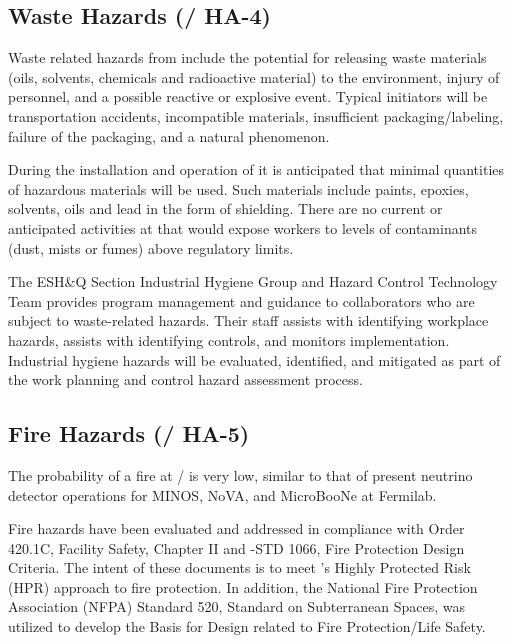 \subsection{Waste Hazards (/ HA-4)}

Waste related hazards from  include the potential for releasing
waste materials (oils, solvents, chemicals and radioactive material)
to the environment, injury of personnel, and a possible reactive or
explosive event. Typical initiators will be transportation accidents,
incompatible materials, insufficient packaging/labeling, failure of
the packaging, and a natural phenomenon.

During the installation and operation of  it is anticipated that
minimal quantities of hazardous materials will be used. Such materials
include paints, epoxies, solvents, oils and lead in the form of
shielding. There are no current or anticipated activities at  that
would expose workers to levels of contaminants (dust, mists or fumes)
above regulatory limits.

The ESH\&Q Section Industrial Hygiene Group and Hazard Control
Technology Team provides program management and guidance to
collaborators who are subject to
waste-related hazards.  Their staff assists with identifying workplace
hazards, assists with identifying controls, and monitors
implementation. Industrial hygiene hazards will be evaluated,
identified, and mitigated as part of the work planning and control
hazard assessment process.

\subsection{Fire Hazards (/ HA-5)}

The probability of a fire at / is very low,
similar to that of present neutrino detector operations for MINOS,
NoVA, and MicroBooNe at Fermilab.


Fire hazards have been evaluated and addressed in compliance with 
Order 420.1C, Facility Safety, Chapter II and -STD 1066, Fire
Protection Design Criteria.  The intent of these documents is to meet
's Highly Protected Risk (HPR) approach to fire protection.  In
addition, the National Fire Protection Association (NFPA) Standard
520, Standard on Subterranean Spaces, was utilized to develop the
Basis for Design related to Fire Protection/Life Safety.

